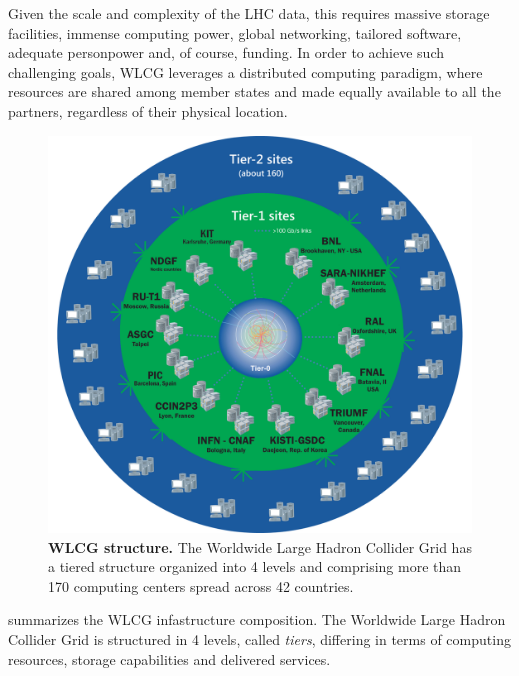 Given the scale and complexity of the LHC data, this requires massive storage facilities, immense computing power, global networking, tailored software, adequate personpower and, of course, funding.
In order to achieve such challenging goals, WLCG leverages a distributed computing paradigm, where resources are shared among member states and made equally available to all the partners, regardless of their physical location.
\begin{figure}
    \centering
    \includegraphics[width=\textwidth]{figures/220_introduction/WLCG-Tiers-2021_v3.png}
    \caption{\textbf{WLCG structure.} The Worldwide Large Hadron Collider Grid has a tiered structure organized into 4 levels and comprising more than 170 computing centers spread across 42 countries.
    } \label{fig:wlcg}
\end{figure}
 summarizes the WLCG infastructure composition. 
The Worldwide Large Hadron Collider Grid is structured in 4 levels, called \textit{tiers}, differing in terms of computing resources, storage capabilities and delivered services. 
